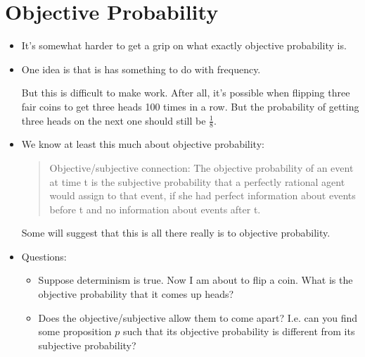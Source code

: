 \documentclass[justified]{tufte-handout}
\begin{document}
\section{Objective Probability}

\begin{itemize}

\item It's somewhat harder to get a grip on what exactly objective probability is.


\item One idea is that is has something to do with frequency. 

But this is difficult to make work. After all, it's possible when flipping three fair coins to get three heads 100 times in a row. But the probability of getting three heads on the next one should still be $\frac{1}{8}$.

\item We know at least this much about objective probability: 

\begin{quote}Objective/subjective connection: The objective probability of an event at time t is the subjective probability
that a perfectly rational agent would assign to that event, if she had perfect
information about events before t and no information about events after t.\end{quote}

Some will suggest that this is all there really is to objective probability.


\item Questions: 

\begin{itemize}

\item Suppose determinism is true. Now I am about to flip a coin. What is the objective probability that it comes up heads?


\item Does the objective/subjective allow them to come apart? I.e. can you find some proposition $p$ such that its objective probability is different from its subjective probability?

\end{itemize}

\end{itemize}
\end{document}
